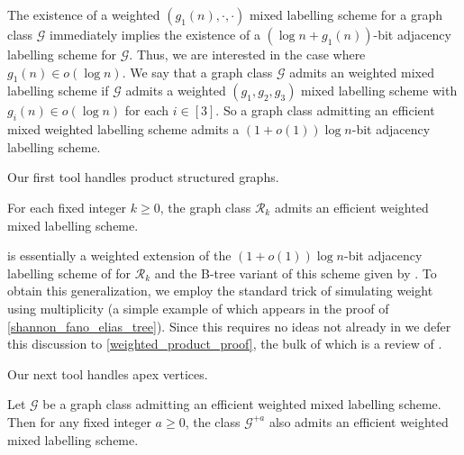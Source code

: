 The existence of a weighted $(g_1(n),\cdot,\cdot)$ mixed labelling scheme for a graph class $\mathcal{G}$ immediately implies the existence of a $(\log n+g_1(n))$-bit adjacency labelling scheme for $\mathcal{G}$. Thus, we are interested in the case where $g_1(n)\in o(\log n)$. We say that a graph class $\mathcal{G}$ admits an  weighted mixed labelling scheme if $\mathcal{G}$ admits a weighted $(g_1,g_2,g_3)$ mixed labelling scheme with $g_i(n)\in o(\log n)$ for each $i\in [3]$. So a graph class admitting an efficient mixed weighted labelling scheme admits a $(1+o(1))\log n$-bit adjacency labelling scheme.

Our first tool handles product structured graphs.

\begin{thm}\label{gk_labelling}
  For each fixed integer $k\ge 0$, the graph class $\mathcal{R}_{k}$ admits an efficient weighted mixed labelling scheme.
\end{thm}

\label{sketch_start}
 is essentially a weighted extension of the $(1+o(1))\log n$-bit adjacency labelling scheme of \citet{dujmovic.esperet.ea:adjacency} for $\mathcal{R}_k$ and the B-tree variant of this scheme given by \citet{gawrychowski.janczewski:simpler}.
To obtain this generalization, we employ the standard trick of simulating weight using multiplicity (a simple example of which appears in the proof of \cref{shannon_fano_elias_tree}).  Since this requires no ideas not already in \cite{gawrychowski.janczewski:simpler,dujmovic.esperet.ea:adjacency} we defer this discussion to \cref{weighted_product_proof}, the bulk of which is a review of \cite{gawrychowski.janczewski:simpler,dujmovic.esperet.ea:adjacency}.

Our next tool handles apex vertices.

\begin{thm}
  \label{HandleApexvertices}
  Let $\mathcal{G}$ be a graph class admitting an efficient weighted mixed labelling scheme. Then for any fixed integer $a\geq 0$, the class $\mathcal{G}^{+a}$ also admits an efficient weighted mixed labelling scheme.
\end{thm}

